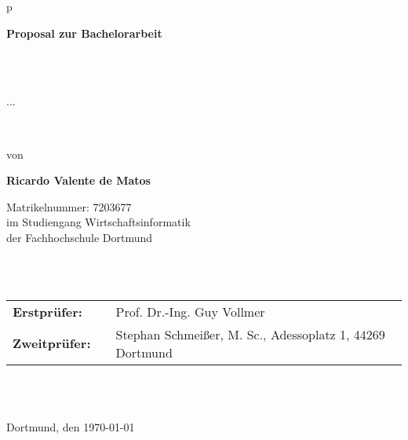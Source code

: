 \begin{center}
	\begin{tabular}{p{\textwidth}}
		
		\begin{center}
			\textbf{\Large{Proposal zur Bachelorarbeit}}
		\end{center} \\ \\
		
		\begin{center}
			\LARGE{\textsc{
					...
			}}
		\end{center}
		
		\\
		
		
		
		\begin{center}
			von
		\end{center}
		
		\begin{center}
			\large{\textbf{Ricardo Valente de Matos}}
		\end{center}
	
	\begin{center}
		\large{Matrikelnummer: 7203677} \\
		\large{im Studiengang Wirtschaftsinformatik \\
			der Fachhochschule Dortmund \\}
	\end{center}
		
		
		\\
		
		\\
		
		\begin{center}
			\begin{tabular}{lll}
				\textbf{Erstprüfer:} & & Prof. Dr.-Ing. Guy Vollmer\\
				\textbf{Zweitprüfer:} & & Stephan Schmeißer, M. Sc., Adessoplatz 1, 44269 Dortmund\\
			\end{tabular}
		\end{center}
	
	\\ \\
	
	\begin{center}
		\large{Dortmund, den \today}
	\end{center}
		
	\end{tabular}
\end{center}